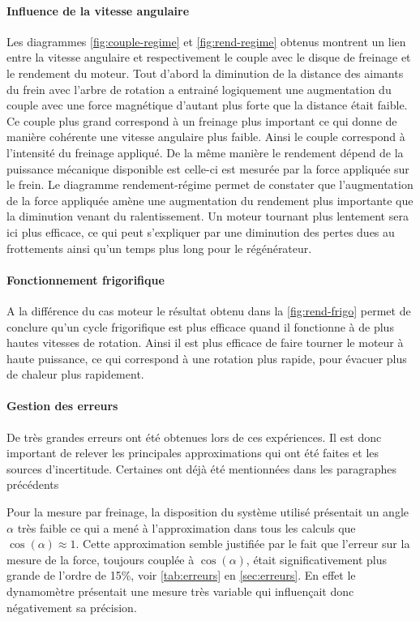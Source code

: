 \paragraph*{Influence de la vitesse angulaire}
Les diagrammes \autoref{fig:couple-regime} et \autoref{fig:rend-regime} obtenus montrent un lien entre la vitesse angulaire et respectivement le couple avec le disque de freinage et le rendement du moteur. Tout d'abord la diminution de la distance des aimants du frein avec l'arbre de rotation a entrainé logiquement une augmentation du couple avec une force magnétique d'autant plus forte que la distance était faible. Ce couple plus grand correspond à un freinage plus important ce qui donne de manière cohérente une vitesse angulaire plus faible. Ainsi le couple correspond à l'intensité du freinage appliqué. De la même manière le rendement dépend de la puissance mécanique disponible est celle-ci est mesurée par la force appliquée sur le frein. Le diagramme rendement-régime permet de constater que l'augmentation de la force appliquée amène une augmentation du rendement plus importante que la diminution venant du ralentissement. Un moteur tournant plus lentement sera ici plus efficace, ce qui peut s'expliquer par une diminution des pertes dues au frottements ainsi qu'un temps plus long pour le régénérateur.

\paragraph*{Fonctionnement frigorifique}
A la différence du cas moteur le résultat obtenu dans la \autoref{fig:rend-frigo} permet de conclure qu'un cycle frigorifique est plus efficace quand il fonctionne à de plus hautes vitesses de rotation. Ainsi il est plus efficace de faire tourner le moteur à haute puissance, ce qui correspond à une rotation plus rapide, pour évacuer plus de chaleur plus rapidement.


\paragraph*{Gestion des erreurs}
De très grandes erreurs ont été obtenues lors de ces expériences. Il est donc important de relever les principales approximations qui ont été faites et les sources d'incertitude. Certaines ont déjà été mentionnées dans les paragraphes précédents

Pour la mesure par freinage, la disposition du système utilisé présentait un angle \(\alpha\) très faible ce qui a mené à l'approximation dans tous les calculs que \(\cos(\alpha) \approx 1\). Cette approximation semble justifiée par le fait que l'erreur sur la mesure de la force, toujours couplée à \(\cos(\alpha)\), était significativement plus grande de l'ordre de 15\%, voir \autoref{tab:erreurs} en \autoref{sec:erreurs}. En effet le dynamomètre présentait une mesure très variable qui influençait donc négativement sa précision.


